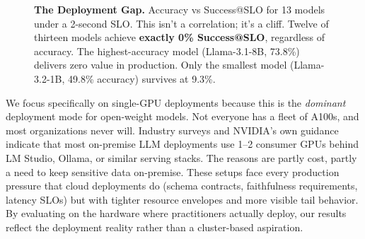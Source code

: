 \documentclass[11pt]{article}
\begin{document}
\begin{figure}[t]
\centering
{}
\caption{\textbf{The Deployment Gap.} Accuracy vs Success@SLO for 13 models under a 2-second SLO.  This isn't a correlation; it's a cliff.  Twelve of thirteen models achieve \textbf{exactly 0\% Success@SLO}, regardless of accuracy.  The highest-accuracy model (Llama-3.1-8B, 73.8\%) delivers zero value in production.  Only the smallest model (Llama-3.2-1B, 49.8\% accuracy) survives at 9.3\%.}
\label{fig:deployment-gap}
\end{figure}

We focus specifically on single-GPU deployments because this is the \emph{dominant} deployment mode for open-weight models.
Not everyone has a fleet of A100s, and most organizations never will.
Industry surveys and NVIDIA's own guidance~\citep{nvidia2025slm} indicate that most on-premise LLM deployments use 1--2 consumer GPUs behind LM Studio, Ollama, or similar serving stacks.  The reasons are partly cost, partly a need to keep sensitive data on-premise.
These setups face every production pressure that cloud deployments do (schema contracts, faithfulness requirements, latency SLOs) but with tighter resource envelopes and more visible tail behavior.
By evaluating on the hardware where practitioners actually deploy, our results reflect the deployment reality rather than a cluster-based aspiration.
\end{document}
